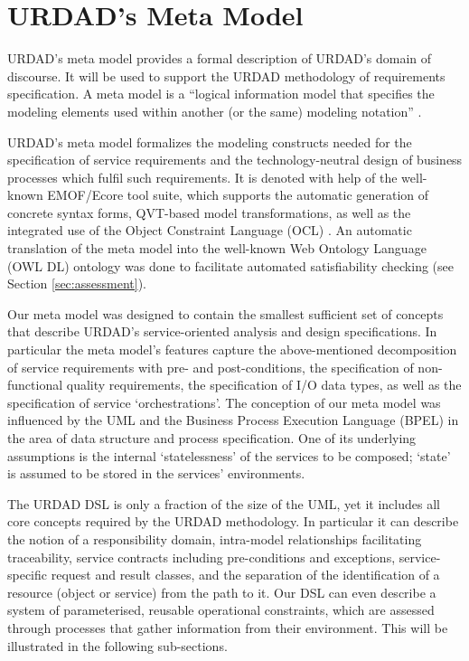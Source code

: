 \section{URDAD's Meta Model \label{sec:metamodel}}

URDAD's meta model provides a formal description of URDAD's domain of discourse. It will be used to support the URDAD methodology of requirements specification. A meta model is a ``logical information model that specifies the modeling elements used within another (or the same) modeling notation'' \cite{_ieee_2003}. 

URDAD's meta model formalizes the modeling constructs needed for the specification of service requirements 
and the technology-neutral design of business processes which fulfil such requirements. It is denoted with help of the well-known EMOF/Ecore tool suite, which supports the automatic generation of concrete syntax forms, QVT-based model transformations, as well as the integrated use of the Object Constraint Language (OCL) \cite{_object_2010}. An automatic translation of the meta model into the well-known Web Ontology Language (OWL DL) ontology was done to facilitate automated satisfiability checking (see Section \ref{sec:assessment}).

Our meta model was designed to contain the smallest sufficient set of concepts that describe URDAD's service-oriented analysis and design specifications. In particular the meta model's features capture the above-mentioned decomposition of service requirements with pre- and post-conditions, the specification of non-functional quality requirements, the specification of I/O data types, as well as the specification of service `orchestrations'. The conception of our meta model was influenced by the UML and the Business Process Execution Language (BPEL) in the area of data structure and process specification. One of its underlying assumptions is the internal `statelessness' of the services to be composed; `state' is assumed to be stored in the services' environments.

The URDAD DSL is only a fraction of the size of the UML, yet it includes all core concepts required by the URDAD methodology. In particular it can describe the notion of a responsibility domain, intra-model relationships facilitating traceability, service contracts including pre-conditions and exceptions, service-specific request and result classes, and the separation of the identification of a resource (object or service) from the path to it. Our DSL can even describe a system of parameterised, reusable operational constraints, which are assessed through processes that gather information from their environment. This will be illustrated in the following sub-sections.


